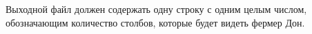 Выходной файл должен содержать одну строку с одним целым числом, 
обозначающим количество столбов, которые будет видеть фермер Дон. 